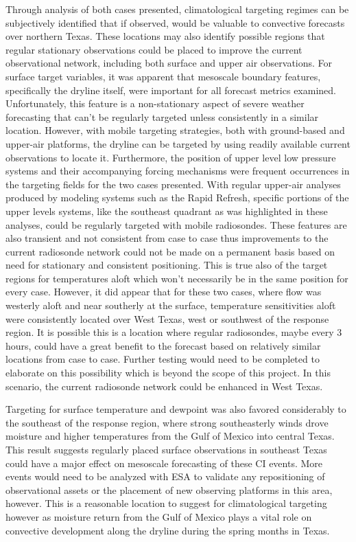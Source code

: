 \documentclass{ttuthes2007}
\newcommand{\tab}{\hspace*{2em}}  %
\begin{document}
\tab Through analysis of both cases presented, climatological targeting regimes can be subjectively identified that if observed, would be valuable to convective forecasts over northern Texas. These locations may also identify possible regions that regular stationary observations could be placed to improve the current observational network, including both surface and upper air observations. For surface target variables, it was apparent that mesoscale boundary features, specifically the dryline itself, were important for all forecast metrics examined. Unfortunately, this feature is a non-stationary aspect of severe weather forecasting that can't be regularly targeted unless consistently in a similar location. However, with mobile targeting strategies, both with ground-based and upper-air platforms, the dryline can be targeted by using readily available current observations to locate it. Furthermore, the position of upper level low pressure systems and their accompanying forcing mechanisms were frequent occurrences in the targeting fields for the two cases presented. With regular upper-air analyses produced by modeling systems such as the Rapid Refresh, specific portions of the upper levels systems, like the southeast quadrant as was highlighted in these analyses, could be regularly targeted with mobile radiosondes. These features are also transient and not consistent from case to case thus improvements to the current radiosonde network could not be made on a permanent basis based on need for stationary and consistent positioning. This is true also of the target regions for temperatures aloft which won't necessarily be in the same position for every case. However, it did appear that for these two cases, where flow was westerly aloft and near southerly at the surface, temperature sensitivities aloft were consistently located over West Texas, west or southwest of the response region. It is possible this is a location where regular radiosondes, maybe every 3 hours, could have a great benefit to the forecast based on relatively similar locations from case to case. Further testing would need to be completed to elaborate on this possibility which is beyond the scope of this project. In this scenario, the current radiosonde network could be enhanced in West Texas. 

\tab Targeting for surface temperature and dewpoint was also favored considerably to the southeast of the response region, where strong southeasterly winds drove moisture and higher temperatures from the Gulf of Mexico into central Texas. This result suggests regularly placed surface observations in southeast Texas could have a major effect on mesoscale forecasting of these CI events. More events would need to be analyzed with ESA to validate any repositioning of observational assets or the placement of new observing platforms in this area, however. This is a reasonable location to suggest for climatological targeting however as moisture return from the Gulf of Mexico plays a vital role on convective development along the dryline during the spring months in Texas. 
\end{document}
